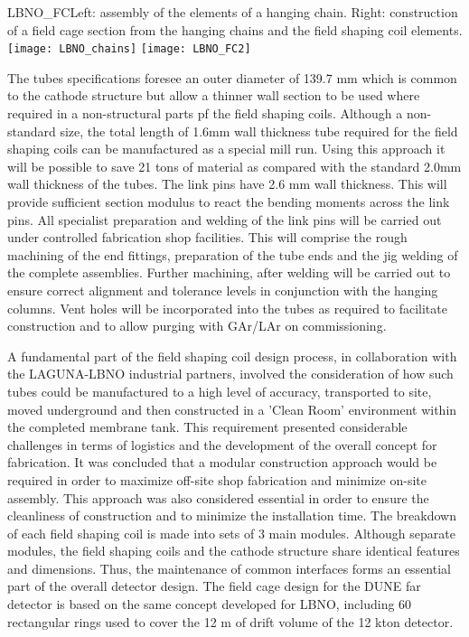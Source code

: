 \begin{cdrfigure}{LBNO_FC}{\small Left: assembly of the elements of a hanging chain. Right: construction of a field cage section from the hanging chains and the field shaping coil elements.}
\texttt{[image: LBNO\_chains]} \hfill
\texttt{[image: LBNO\_FC2]}
\end{cdrfigure}

The tubes specifications foresee an outer diameter of  139.7 mm which is common to the cathode structure but allow a thinner wall section to be used where required in a non-structural parts pf the field shaping coils.  Although a non-standard size, the total length of 1.6mm wall thickness tube required for the field shaping coils can be manufactured as a special mill run.  Using this approach it will be possible to save 21 tons of material as compared with the standard 2.0mm wall thickness of the tubes. The link pins have 2.6 mm wall thickness. This will provide sufficient section modulus to react the bending moments across the link pins. All specialist preparation and welding of the link pins will be carried out under controlled fabrication shop facilities.  This will comprise the rough machining of the end fittings, preparation of the tube ends and the jig welding of the complete assemblies. Further machining, after welding will be carried out to ensure correct alignment and tolerance levels in conjunction with the hanging columns.  Vent holes will be incorporated into the tubes as required to facilitate construction and to allow purging with GAr/LAr on commissioning.

A fundamental part of the field shaping coil design process, in collaboration with the LAGUNA-LBNO industrial partners, involved the consideration of how such tubes could be manufactured to a high level of accuracy, transported to site, moved underground and then constructed in a 'Clean Room' environment within the completed membrane tank.  This requirement presented considerable challenges in terms of logistics and the development of the overall concept for fabrication.  It was concluded that a modular construction approach would be required in order to maximize off-site shop fabrication and minimize on-site assembly.  This approach was also considered essential in order to ensure the cleanliness of construction and to minimize the installation time. The breakdown of each field shaping coil is made into sets of 3 main modules.  Although separate modules, the field shaping coils and the cathode structure share identical features and dimensions.  Thus, the maintenance of common interfaces forms an essential part of the overall detector design. The field cage design for the DUNE far detector is based on the same concept developed for LBNO, including 60 rectangular rings used to cover the 12 m of drift volume of the 12 kton detector.

